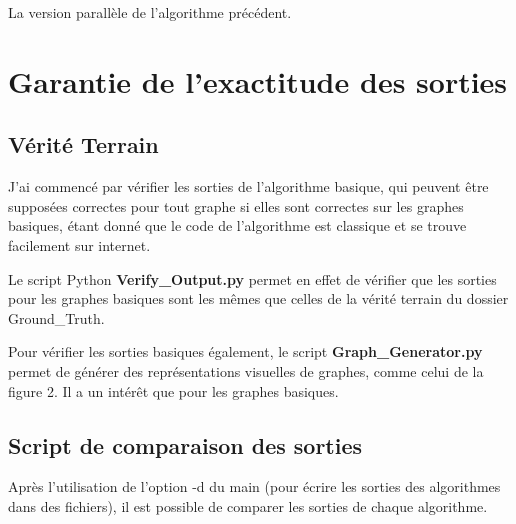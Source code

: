 \documentclass[a4paper,11pt]{article}
\begin{document}
La version parallèle de l'algorithme précédent.

\section{Garantie de l'exactitude des sorties}
\subsection{Vérité Terrain}

J'ai commencé par vérifier les sorties de l'algorithme basique, qui peuvent être supposées correctes pour tout graphe si elles sont correctes sur les graphes basiques, étant donné que le code de l'algorithme est classique et se trouve facilement sur internet.

Le script Python \textbf{Verify\_Output.py} permet en effet de vérifier que les sorties pour les graphes basiques sont les mêmes que celles de la vérité terrain du dossier Ground\_Truth.

Pour vérifier les sorties basiques également, le script \textbf{Graph\_Generator.py} permet de générer des représentations visuelles de graphes, comme celui de la figure 2. Il a un intérêt que pour les graphes basiques.

\subsection{Script de comparaison des sorties}

Après l'utilisation de l'option -d du main (pour écrire les sorties des algorithmes dans des fichiers), il est possible de comparer les sorties de chaque algorithme.
\end{document}
